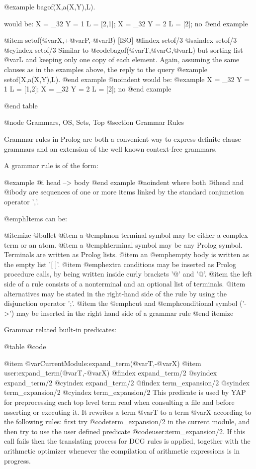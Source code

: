 {{{{{{@example
bagof(X,a(X,Y),L).

would be:
X = _32
Y = 1
L = [2,1];
X = _32
Y = 2
L = [2];
no
@end example

@item setof(@var{X},+@var{P},-@var{B}) [ISO]
@findex setof/3
@saindex setof/3
@cyindex setof/3
Similar to @code{bagof(@var{T},@var{G},@var{L})} but sorting list
@var{L} and keeping only one copy of each element.  Again, assuming the
same clauses as in the examples above, the reply to the query
@example
setof(X,a(X,Y),L).
@end example
@noindent
would be:
@example
X = _32
Y = 1
L = [1,2];
X = _32
Y = 2
L = [2];
no
@end example

@end table

@node Grammars, OS, Sets, Top
@section Grammar Rules

Grammar rules in Prolog are both a convenient way to express definite
clause grammars and  an extension of the well known context-free grammars.

A grammar rule is of the form:

@example
@i{ head --> body }
@end example
@noindent
where both @i{head} and @i{body} are sequences of one or more items
linked by the standard conjunction operator ','.

@emph{Items can be:}

@itemize @bullet
@item
a @emph{non-terminal} symbol may be either a complex term or an atom.
@item
a @emph{terminal} symbol may be any Prolog symbol. Terminals are
written as Prolog lists.
@item
an @emph{empty body} is written as the empty list '[ ]'.
@item
@emph{extra conditions} may be inserted as Prolog procedure calls, by being
written inside curly brackets '@{' and '@}'.
@item
the left side of a rule consists of a nonterminal and an optional list
of terminals.
@item
alternatives may be stated in the right-hand side of the rule by using
the disjunction operator ';'.
@item
the @emph{cut} and @emph{conditional} symbol ('->') may be inserted in the 
right hand side of a grammar rule
@end itemize

Grammar related built-in predicates:

@table @code

@item @var{CurrentModule}:expand_term(@var{T},-@var{X})
@item user:expand_term(@var{T},-@var{X})
@findex expand_term/2
@syindex expand_term/2
@cyindex expand_term/2
@findex term_expansion/2
@syindex term_expansion/2
@cyindex term_expansion/2
This predicate is used by YAP for preprocessing each top level
term read when consulting a file and before asserting or executing it.
It rewrites a term @var{T} to a term @var{X} according to the following
rules: first try @code{term_expansion/2}  in the current module, and then try to use the user defined predicate
@code{user:term_expansion/2}. If this call fails then the translating process
for DCG rules is applied, together with the arithmetic optimizer
whenever the compilation of arithmetic expressions is in progress.

}}}}}}
